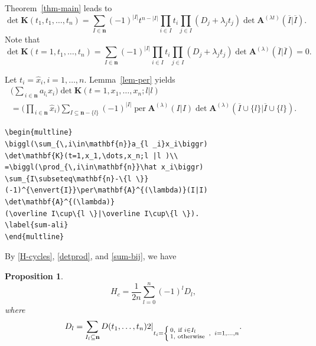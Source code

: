 \documentclass[manuscript, printscheme]{aomart}
\newtheorem[{}\it]{thm}{Theorem}[section]
\newtheorem{prop}[thm]{Proposition}
\theoremstyle{definition}
\newtheorem*[{}\it]{notation}{Notation}
\DeclareMathOperator{\per}{per}
\newcommand{\eval}[2][\right]{\relax
  \ifx#1\right\relax \left.\fi#2#1\rvert}
\newcommand{\envert}[1]{\left\lvert#1\right\rvert}
\begin{document}
Theorem~\ref{thm-main} leads to
\begin{equation}\label{detK1}
\det\mathbf{K}(t_1,t_1,\dots,t_n)
=\sum_{I\in\mathbf{n}}(-1)^{\envert{I}}t^{n-\envert{I}}
\prod_{i\in I}t_i\prod_{j\in I}(D_j+\lambda_jt_j)\det\mathbf{A}
^{(\lambda t)}(\overline{I}|\overline I).
\end{equation}
Note that
\begin{equation}\label{detK2}
\det\mathbf{K}(t=1,t_1,\dots,t_n)=\sum_{I\in\mathbf{n}}(-1)^{\envert{I}}
\prod_{i\in I}t_i\prod_{j\in I}(D_j+\lambda_jt_j)\det\mathbf{A}
^{(\lambda)}(\overline{I}|\overline{I})=0.
\end{equation}

Let $t_i=\hat x_i,i=1,\dots,n$. Lemma~\ref{lem-per} yields
\begin{multline}
\biggl(\sum_{\,i\in\mathbf{n}}a_{l _i}x_i\biggr)
\det\mathbf{K}(t=1,x_1,\dots,x_n;l |l )\\
=\biggl(\prod_{\,i\in\mathbf{n}}\hat x_i\biggr)
\sum_{I\subseteq\mathbf{n}-\{l \}}
(-1)^{\envert{I}}\per\mathbf{A}^{(\lambda)}(I|I)
\det\mathbf{A}^{(\lambda)}
(\overline I\cup\{l \}|\overline I\cup\{l \}).
\label{sum-ali}
\end{multline}
\begin{verbatim}
\begin{multline}
\biggl(\sum_{\,i\in\mathbf{n}}a_{l _i}x_i\biggr)
\det\mathbf{K}(t=1,x_1,\dots,x_n;l |l )\\
=\biggl(\prod_{\,i\in\mathbf{n}}\hat x_i\biggr)
\sum_{I\subseteq\mathbf{n}-\{l \}}
(-1)^{\envert{I}}\per\mathbf{A}^{(\lambda)}(I|I)
\det\mathbf{A}^{(\lambda)}
(\overline I\cup\{l \}|\overline I\cup\{l \}).
\label{sum-ali}
\end{multline}
\end{verbatim}

By \eqref{H-cycles}, \eqref{detprod}, and \eqref{sum-bij}, we have
\begin{prop}\label{prop:eg}
\begin{equation}
H_c=\frac1{2n}\sum^n_{l =0}(-1)^{l}
D_{l},
\end{equation}
where
\begin{equation}\label{delta-l}
D_{l}=\eval[2]{\sum_{I_{l}\subseteq \mathbf{n}}
D(t_1,\dots,t_n)}_{t_i=\left\{\begin{smallmatrix}
0,& \text{if }i\in I_{l}\quad\\%
1,& \text{otherwise}\end{smallmatrix}\right.\;,\;\; i=1,\dots,n}.
\end{equation}
\end{prop}
\end{document}
